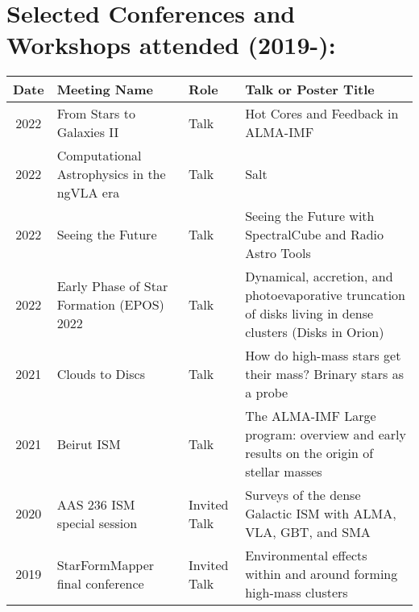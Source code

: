 \begin{minipage}{\textwidth}
\setlength{\extrarowheight}{4pt}
\section*{Selected Conferences and Workshops attended (2019-): }
\vspace{-12pt}
\begin{tabular}{cp{1.8in}p{1.5cm}p{3.0in}}
    Date & Meeting Name & Role & Talk or Poster Title \\
                \hline
    2022 &      From Stars to Galaxies II & Talk & Hot Cores and Feedback in ALMA-IMF \\
    2022 &      Computational Astrophysics in the ngVLA era & Talk & Salt \\
    2022 &      Seeing the Future & Talk & Seeing the Future with SpectralCube and Radio Astro Tools \\
    2022 &      Early Phase of Star Formation (EPOS) 2022 & Talk &  Dynamical, accretion, and photoevaporative truncation of disks living in dense clusters (Disks in Orion)\\
    2021 &      Clouds to Discs & Talk & How do high-mass stars get their mass? Brinary stars as a probe \\
    2021 &      Beirut ISM & Talk & The ALMA-IMF Large program: overview and early results on the origin of stellar masses \\
    2020 &      AAS 236 ISM special session & Invited Talk &  Surveys of the dense Galactic ISM with ALMA, VLA, GBT, and SMA \\
    2019 &      StarFormMapper final conference & Invited Talk & Environmental effects within and around forming high-mass clusters \\

\end{tabular}
\end{minipage}
